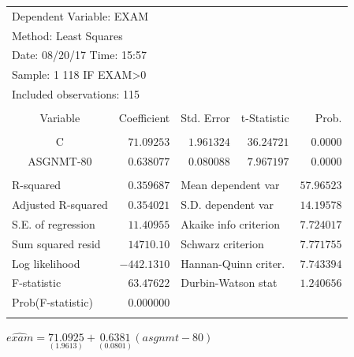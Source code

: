 \documentclass[12pt]{report}
\begin{document}
\begin{table}[H]
	\centering
	\begin{tabular}{lrrrr}
		\multicolumn{3}{l}{Dependent Variable: EXAM}&\multicolumn{1}{c}{}&\multicolumn{1}{c}{}\\
		\multicolumn{3}{l}{Method: Least Squares}&\multicolumn{1}{c}{}&\multicolumn{1}{c}{}\\
		\multicolumn{3}{l}{Date: 08/20/17   Time: 15:57}&\multicolumn{1}{c}{}&\multicolumn{1}{c}{}\\
		\multicolumn{3}{l}{Sample: 1 118 IF EXAM\textgreater 0}&\multicolumn{1}{c}{}&\multicolumn{1}{c}{}\\
		\multicolumn{3}{l}{Included observations: 115}&\multicolumn{1}{c}{}&\multicolumn{1}{c}{}\\
		[4.5pt] \hline \\ [-4.5pt]
		\multicolumn{1}{c}{Variable}&\multicolumn{1}{r}{Coefficient}&\multicolumn{1}{r}{Std. Error}&\multicolumn{1}{r}{t-Statistic}&\multicolumn{1}{r}{Prob.}\\
		[4.5pt] \hline \\ [-4.5pt]
		\multicolumn{1}{c}{C}&\multicolumn{1}{r}{$71.09253$}&\multicolumn{1}{r}{$1.961324$}&\multicolumn{1}{r}{$36.24721$}&\multicolumn{1}{r}{$0.0000$}\\
		\multicolumn{1}{c}{ASGNMT-80}&\multicolumn{1}{r}{$0.638077$}&\multicolumn{1}{r}{$0.080088$}&\multicolumn{1}{r}{$7.967197$}&\multicolumn{1}{r}{$0.0000$}\\
		[4.5pt] \hline \\ [-4.5pt]
		\multicolumn{1}{l}{R-squared}&\multicolumn{1}{r}{$0.359687$}&\multicolumn{2}{l}{Mean dependent var}&\multicolumn{1}{r}{$57.96523$}\\
		\multicolumn{1}{l}{Adjusted R-squared}&\multicolumn{1}{r}{$0.354021$}&\multicolumn{2}{l}{S.D. dependent var}&\multicolumn{1}{r}{$14.19578$}\\
		\multicolumn{1}{l}{S.E. of regression}&\multicolumn{1}{r}{$11.40955$}&\multicolumn{2}{l}{Akaike info criterion}&\multicolumn{1}{r}{$7.724017$}\\
		\multicolumn{1}{l}{Sum squared resid}&\multicolumn{1}{r}{$14710.10$}&\multicolumn{2}{l}{Schwarz criterion}&\multicolumn{1}{r}{$7.771755$}\\
		\multicolumn{1}{l}{Log likelihood}&\multicolumn{1}{r}{$-442.1310$}&\multicolumn{2}{l}{Hannan-Quinn criter.}&\multicolumn{1}{r}{$7.743394$}\\
		\multicolumn{1}{l}{F-statistic}&\multicolumn{1}{r}{$63.47622$}&\multicolumn{2}{l}{Durbin-Watson stat}&\multicolumn{1}{r}{$1.240656$}\\
		\multicolumn{1}{l}{Prob(F-statistic)}&\multicolumn{1}{r}{$0.000000$}&\multicolumn{1}{c}{}&\multicolumn{1}{c}{}&\multicolumn{1}{c}{}\\
		[4.5pt] \hline \\ [-4.5pt]
	\end{tabular}
\end{table}
\vspace{-\baselineskip}
\centering $\widehat{exam} = \underset{(1.9613)}{71.0925} + \underset{(0.0801)}{0.6381}(asgnmt-80)$
\end{document}
